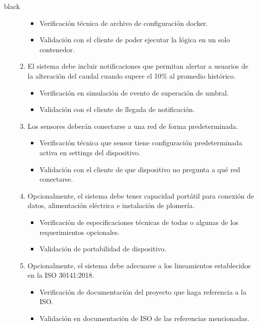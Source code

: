 \documentclass[
11pt, %
codirector, %
]{charter}
\begin{document}
\begin{consigna}{black}
\begin{enumerate}
\begin{enumerate}
\begin{itemize}
				\item Verificación técnica de archivo de configuración docker. 
				\item Validación con el cliente de poder ejecutar la lógica en un solo contenedor.
			\end{itemize}
		\item El sistema debe incluir notificaciones que permitan alertar a usuarios de la alteración del caudal cuando supere el 10\% al promedio histórico.	
			\begin{itemize}
				\item Verificación en simulación de evento de superación de umbral. 
				\item Validación con el cliente de llegada de notificación. 
			\end{itemize}
		\item Los sensores deberán conectarse a una red de forma predeterminada.	
			\begin{itemize}
				\item Verificación técnica que sensor tiene configuración predeterminada activa en settings del dispositivo. 
				\item Validación con el cliente de que dispositivo no pregunta a qué red conectarse. 
			\end{itemize}
		\item Opcionalmente, el sistema debe tener capacidad portátil para conexión de datos, alimentación eléctrica e instalación de plomería.
			\begin{itemize}
				\item Verificación de especificaciones técnicas de todas o algunas de los requerimientos opcionales. 
				\item Validación de portabilidad de dispositivo.  
			\end{itemize}
		\item Opcionalmente, el sistema debe adecuarse a los lineamientos establecidos en la ISO 30141:2018.
			\begin{itemize}
				\item Verificación de documentación del proyecto que haga referencia a la ISO. 
				\item Validación en documentación de ISO de las referencias mencionadas.
			\end{itemize}
	\end{enumerate}


\end{enumerate}
\end{consigna}
\end{document}
